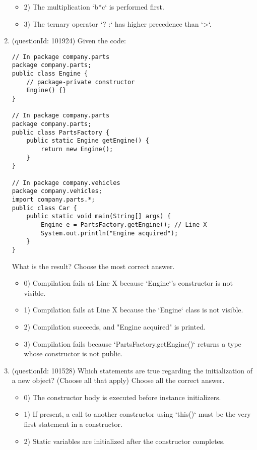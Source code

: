 \documentclass[12pt]{article}
\begin{document}
\begin{enumerate}[label=(\arabic*)]
\begin{itemize}
\item 2) The multiplication `b*c` is performed first.

\item 3) The ternary operator `? :` has higher precedence than `>`.

\end{itemize}
\item (questionId: 101924) Given the code:
\begin{verbatim}
// In package company.parts
package company.parts;
public class Engine {
    // package-private constructor
    Engine() {}
}

// In package company.parts
package company.parts;
public class PartsFactory {
    public static Engine getEngine() {
        return new Engine();
    }
}

// In package company.vehicles
package company.vehicles;
import company.parts.*;
public class Car {
    public static void main(String[] args) {
        Engine e = PartsFactory.getEngine(); // Line X
        System.out.println("Engine acquired");
    }
}
\end{verbatim}
What is the result?
Choose the most correct answer. 
\begin{itemize}
\item 0) Compilation fails at Line X because `Engine`'s constructor is not visible.

\item 1) Compilation fails at Line X because the `Engine` class is not visible.

\item 2) Compilation succeeds, and "Engine acquired" is printed.

\item 3) Compilation fails because `PartsFactory.getEngine()` returns a type whose constructor is not public.

\end{itemize}
\item (questionId: 101528) Which statements are true regarding the initialization of a new object? (Choose all that apply)
Choose all the correct answer.\begin{itemize}
\item 0) The constructor body is executed before instance initializers.

\item 1) If present, a call to another constructor using `this()` must be the very first statement in a constructor.

\item 2) Static variables are initialized after the constructor completes.


\end{itemize}
\end{enumerate}
\end{document}
